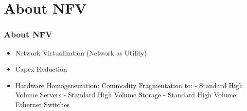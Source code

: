\section{About NFV}

\begin{frame}
\frametitle{About NFV}

\begin{itemize}
 \item Network Virtualization (Network as Utility)
 \item Capex Reduction
 \item Hardware Homogeneization: Commodity Fragmentation to:\linebreak
	- Standard High Volume Servers\linebreak
	- Standard High Volume Storage\linebreak
	- Standard High Volume Ethernet Switches
\end{itemize}

\end{frame}
